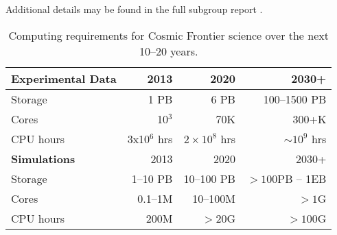 Additional details may be found in the full subgroup report \cite{Connolly:2013ibs}.


\begin{center}
\begin{table}
\caption{Computing requirements for Cosmic Frontier science over the next
 10--20 years.}
\begin{center}
\begin{tabular}{|l|r|r|r|} 
 \hline 
{\bf Experimental Data} & 2013 & 2020 & 2030+ \\
\hline
Storage & 1 PB & 6 PB & 100--1500 PB \\
Cores & 10$^3$ & 70K & 300+K \\
CPU hours & 3x10$^6$ hrs & $2\times 10^8$ hrs & $\sim 10^9$ hrs \\
 \hline 
{\bf Simulations} &2013 & 2020 & 2030+ \\
 \hline 
Storage & 1--10 PB & 10--100 PB & $> 100 $PB -- 1EB\\
Cores & 0.1--1M & 10--100M &$> 1$G\\
CPU hours & 200M & $>$20G & $> 100$G\\
\hline
\end{tabular}
\end{center}
\label{tab:CosmicCompNeeds}
\end{table}
\end{center}

